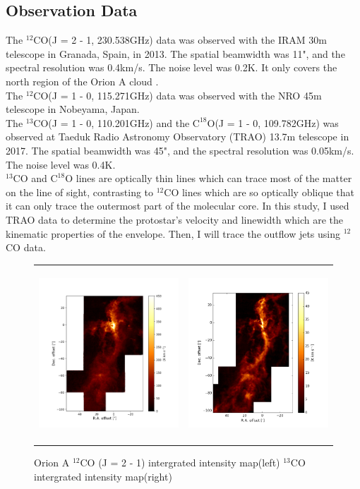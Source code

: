 \documentclass[twoside,11pt]{gshs_thesis}
\begin{document}
\subsection{Observation Data}
The $^{12}$CO(J = 2 - 1, 230.538GHz) data was observed with the IRAM 30m telescope in Granada, Spain, in 2013. The spatial beamwidth was 11", and the spectral resolution was 0.4km/s. The noise level was 0.2K. It only covers the north region of the Orion A cloud \cite{Berne}. \\
The $^{12}$CO(J = 1 - 0, 115.271GHz) data was observed with the NRO 45m telescope in Nobeyama, Japan.  \\
The $^{13}$CO(J = 1 - 0, 110.201GHz) and the $\textrm{C}^{18}\textrm{O}$(J = 1 - 0, 109.782GHz) was observed at Taeduk Radio Astronomy Observatory (TRAO) 13.7m telescope in 2017. The spatial beamwidth was 45", and the spectral resolution was 0.05km/s. The noise level was 0.4K.\\
$^{13}$CO and $\textrm{C}^{18}\textrm{O}$ lines are optically thin lines which can trace most of the matter on the line of sight, contrasting to $^{12}$CO lines which are so optically oblique that it can only trace the outermost part of the molecular core. In this study, I used TRAO data to determine the protostar's velocity and linewidth which are the kinematic properties of the envelope. Then, I will trace the outflow jets using $^{12}$CO data.
\begin{figure}[h]
	\begin{center}
		\begin{tabular}{cc}
			\includegraphics[height=6.5cm]{RNE_12CO_Orion.png} & \includegraphics[height=6.5cm]{Orion_13CO_intmap.png}
		\end{tabular}
	\end{center}
	\caption{Orion A $^{12}$CO (J = 2 - 1) intergrated intensity map(left) $^{13}$CO intergrated intensity map(right)}
\end{figure}
\end{document}
